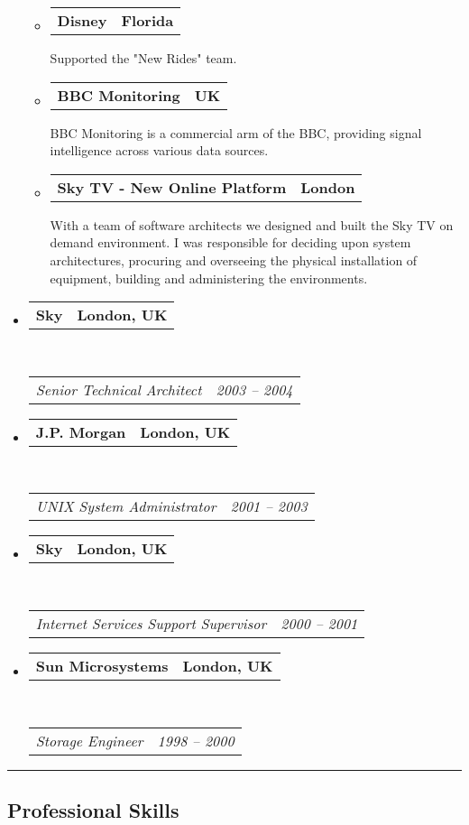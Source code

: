 \documentclass[10pt,a4paper]{article}
\makeatletter
\newcommand{\headerrow}[2]
{\begin{tabular*}{\linewidth}{l@{\extracolsep{\fill}}r}
	#1 &
	#2 \\
\end{tabular*}}
\makeatother
\begin{document}
\begin{itemize}
\begin{itemize}
					\item
          \headerrow
              {\textbf{Disney}}
              {\textbf{Florida}}
              Supported the "New Rides" team.

					\item
          \headerrow
              {\textbf{BBC Monitoring}}
              {\textbf{UK}}
              BBC Monitoring is a commercial arm of the BBC, providing signal intelligence across various data sources.

				\item
				\headerrow
						{\textbf{Sky TV - New Online Platform}}
						{\textbf{London}}
						With a team of software architects we designed and built the Sky TV on demand environment.  I was responsible for deciding upon system architectures, procuring and overseeing the physical installation of equipment, building and administering the environments.


			\end{itemize}

	\item
	\headerrow
		{\textbf{Sky}}
		{\textbf{London, UK}}
	\\
	\headerrow
		{\emph{Senior Technical Architect}}
		{\emph{2003 -- 2004}}

	\item
	\headerrow
		{\textbf{J.P. Morgan}}
		{\textbf{London, UK}}
	\\
	\headerrow
		{\emph{UNIX System Administrator}}
		{\emph{2001 -- 2003}}

	\item
	\headerrow
		{\textbf{Sky}}
		{\textbf{London, UK}}
	\\
	\headerrow
		{\emph{Internet Services Support Supervisor}}
		{\emph{2000 -- 2001}}

	\item
	\headerrow
		{\textbf{Sun Microsystems}}
		{\textbf{London, UK}}
	\\
	\headerrow
		{\emph{Storage Engineer}}
		{\emph{1998 -- 2000}}
\end{itemize}


\hrule
\vspace{-0.4em}
\subsection*{Professional Skills}
\end{document}
